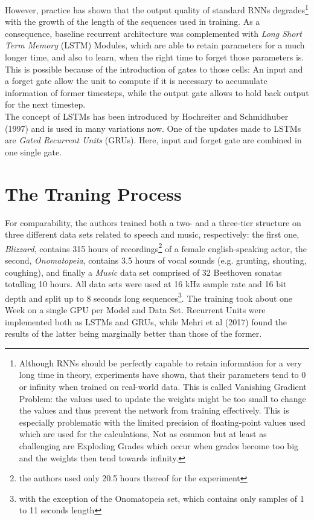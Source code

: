 \documentclass[a4paper, 11pt]{report}
\begin{document}
However, practice has shown that the output quality of standard RNNs degrades\footnote{
    Although RNNs should be perfectly capable to retain information for a very long time 
    in theory, experiments have shown, that their parameters tend to 0 or infinity when 
    trained on real-world data. This is called Vanishing Gradient Problem: the values 
    used to update the weights might be too small to change the values and thus prevent 
    the network from training effectively. This is especially problematic with the 
    limited precision of floating-point values used which are used for the calculations, 
    Not as common but at least as challenging are Exploding Grades which occur when 
    grades become too big and the weights then tend towards infinity\cite[p.286, 
    pp.396]{goodfellow2016deep}. 
} 
with the growth of the length of the sequences used in training. As a consequence, 
baseline recurrent architecture was complemented with \textit{Long Short Term Memory} 
(LSTM) Modules, which are able to retain parameters for a much longer time, and 
also to learn, when the right time to forget those parameters is. This is possible 
because of the introduction of gates to those cells: An input and a forget gate 
allow the unit to compute if it is necessary to accumulate information of former 
timesteps, while the output gate allows to hold back output for the next timestep. \\
The concept of LSTMs has been introduced by Hochreiter and Schmidhuber (1997) and 
is used in many variations now. One of the updates made to LSTMs are \textit{Gated Recurrent 
Units} (GRUs). Here, input and forget gate are combined in one single gate.

\section{The Traning Process}
For comparability, the authors trained both a two- and a three-tier structure 
on three different data sets related to speech and music, respectively: the 
first one, \textit{Blizzard}, contains 315 hours of recordings\footnote{the 
authors used only 20.5 hours thereof for the experiment
} 
of a female english-speaking 
actor, the second, \textit{Onomatopeia}, contains 3.5 hours of vocal sounds (e.g. grunting, 
shouting, coughing), and finally a \textit{Music} data set comprised of 32 Beethoven sonatas 
totalling 10 hours. All data sets were used at 16 kHz sample rate and 16 bit depth 
and split up to 8 seconds long sequences\footnote{with the exception of the Onomatopeia set, 
which contains only samples of 1 to 11 seconds length}. 
The training took about one Week on a single GPU per Model and Data Set. Recurrent Units were 
implemented both as LSTMs and GRUs, while Mehri et al (2017) found the results of the latter 
being marginally better than those of the former. 
\end{document}

